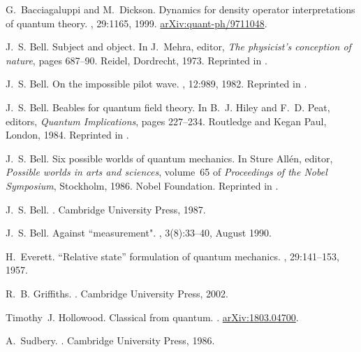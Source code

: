 \documentclass[12pt,a4paper,reqno]{article}
\renewcommand{\(}{\left(}
\renewcommand{\)}{\right)}
\renewcommand{\.}{\centerdot}
\newcommand{\1}{\mathbf{1}}
\newcommand{\<}{\langle}
\renewcommand{\>}{\rangle}
\theoremstyle{definition}
\theoremstyle{remark}
\numberwithin{equation}{section}
\begin{document}
\begin{thebibliography}{10}

G.~Bacciagaluppi and M.~Dickson.
\newblock Dynamics for density operator interpretations of quantum theory.
, 29:1165, 1999.
\newblock
  \href{https://arxiv.org/abs/quant-ph/9711048}{arXiv:quant-ph/9711048}.

J.~S. Bell.
\newblock Subject and object.
\newblock In J.~Mehra, editor, {\em The physicist's conception of nature},
  pages 687--90. Reidel, Dordrecht, 1973.
\newblock Reprinted in \cite{Bell:book}.

J.~S. Bell.
\newblock On the impossible pilot wave.
, 12:989, 1982.
\newblock Reprinted in \cite{Bell:book}.

J.~S. Bell.
\newblock Beables for quantum field theory.
\newblock In B.~J. Hiley and F.~D. Peat, editors, {\em Quantum Implications},
  pages 227--234. Routledge and Kegan Paul, London, 1984.
\newblock Reprinted in \cite{Bell:book}.

J.~S. Bell.
\newblock Six possible worlds of quantum mechanics.
\newblock In Sture All\'en, editor, {\em Possible worlds in arts and sciences},
  volume~65 of {\em Proceedings of the {N}obel {S}ymposium}, Stockholm, 1986.
  {N}obel {F}oundation.
\newblock Reprinted in \cite{Bell:book}.

J.~S. Bell.
.
\newblock Cambridge University Press, 1987.

J.~S. Bell.
\newblock Against ``measurement{"}.
, 3(8):33--40, August 1990.

H.~Everett.
\newblock ``{R}elative state'' formulation of quantum mechanics.
, 29:141--153, 1957.

R.~B. Griffiths.
.
\newblock Cambridge University Press, 2002.

Timothy~J. Hollowood.
\newblock Classical from quantum.
.
\newblock \href{https://arxiv.org/abs/1803.04700}{arXiv:1803.04700}.

A.~Sudbery.
.
\newblock Cambridge University Press, 1986.


\end{thebibliography}
\end{document}
